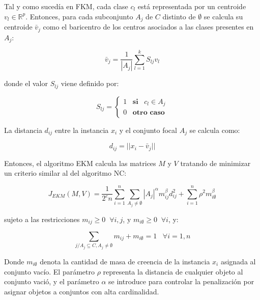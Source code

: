 Tal y como sucedía en \acf{FKM}, cada clase $c_l$ está representada por un centroide $v_l \in \mathbb{R}^p$. Entonces, para cada subconjunto $A_j$ de $C$ distinto de $\emptyset$ se calcula su centroide $\bar{v}_j$ como el baricentro de los centros asociados a las clases presentes en $A_j$:

\begin{equation}
\bar{v}_j = \frac{1}{|A_j|} \sum_{l=1}^{k} S_{lj} v_l
\label{eqn11}
\end{equation}

donde el valor $S_{lj}$ viene definido por:

\begin{equation}
S_{lj} = \begin{cases}
1 \;\;\; \textbf{si} \;\;\; c_l \in A_j\\
0 \;\;\; \textbf{otro caso}
\end{cases}
\label{eqn12}
\end{equation}

La distancia $d_{ij}$ entre la instancia $x_i$ y el conjunto focal $A_j$ se calcula como:

\begin{equation}
d_{ij} = ||x_i - \bar{v}_j||
\label{eqn13}
\end{equation}

Entonces, el algoritmo \acs{EKM} calcula las matrices $M$ y $V$ tratando de minimizar un criterio similar al del algoritmo \acs{NC}:

\begin{equation}
J_{EKM}(M,V) = \frac{1}{2^cn} \sum_{i=1}^{n}\sum_{A_j \neq \emptyset} |A_j|^\alpha m_{ij}^\beta d_{ij}^2 + \sum_{i=1}^{n} \rho^2 m_{i\emptyset}^\beta
\label{eqn14}
\end{equation}

sujeto a las restricciones $m_{ij} \ge 0 \;\; \forall i,j$, y $m_{i\emptyset} \ge 0 \;\; \forall i$, y:

\begin{equation}
\sum_{j/A_j \subseteq C, A_j \neq \emptyset} m_{ij} + m_{i\emptyset} = 1 \;\;\; \forall i = 1,n
\label{eqn15}
\end{equation}

Donde $m_{i\emptyset}$ denota la cantidad de masa de creencia de la instancia $x_i$ asignada al conjunto vacío. El parámetro $\rho$ representa la distancia de cualquier objeto al conjunto vació, y el parámetro $\alpha$ se introduce para controlar la penalización por asignar objetos a conjuntos con alta cardinalidad.

